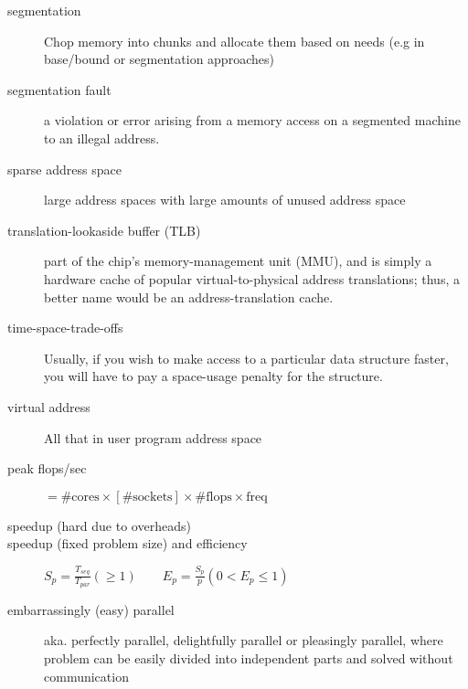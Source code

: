 \begin{description}
\item[segmentation] Chop memory into  chunks and allocate them based on needs (e.g in base/bound or segmentation approaches)

\item[segmentation fault] a violation or error arising from a memory access on a segmented machine to an illegal address.

\item[sparse address space] large address spaces with large amounts of unused address space

\item[translation-lookaside buffer (TLB)] part of the chip’s memory-management unit (MMU), and is simply a hardware cache of popular virtual-to-physical address translations; thus, a better name would be an address-translation cache.

\item[time-space-trade-offs] Usually, if you wish to make access to a particular data structure faster, you will have to pay a space-usage penalty for the structure.

\item[virtual address] All that in user program address space



\item[peak flops/sec] $ = \# \text{cores} \times [\# \text{sockets}] \times \# \text{flops} \times \text{freq}$

\item[speedup (hard due to overheads)]

\item[speedup (fixed problem size) and efficiency] $S_p = \frac{T_{seq}}{T_{par}} (\geq 1)\qquad E_p = \frac{S_{p}}{p} (0 < E_p \leq 1)$


\item[embarrassingly (easy) parallel] aka. perfectly parallel, delightfully parallel or pleasingly parallel, where problem can be easily divided into independent parts and solved without communication


\end{description}
